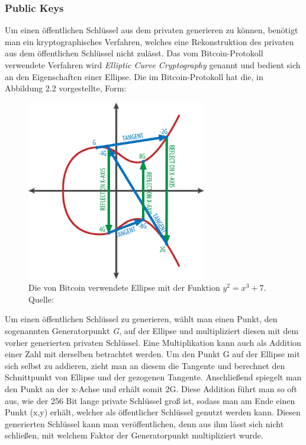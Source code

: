 \subsubsection{Public Keys}
Um einen öffentlichen Schlüssel aus dem privaten generieren zu können, benötigt man ein kryptographisches Verfahren, welches eine Rekonstruktion des privaten aus dem öffentlichen Schlüssel nicht zulässt.
Das vom Bitcoin-Protokoll verwendete Verfahren wird \emph{Elliptic Curve Cryptography} genannt und bedient sich an den Eigenschaften einer Ellipse. Die im Bitcoin-Protokoll hat die, in Abbildung 2.2 vorgestellte, Form:
\begin{figure}[htpb]
	\centering
	\includegraphics[width=0.7\textwidth]{images/elliptic_curve_cryptography.png}
	\caption{Die von Bitcoin verwendete Ellipse mit der Funktion $y^{2} = x^{3} + 7$. \\Quelle: \cite[S. 64]{antanopoulos_2014}}
	\label{6braun:fig:ellipse}
\end{figure}

Um einen öffentlichen Schlüssel zu generieren, wählt man einen Punkt, den sogenannten Generatorpunkt \emph{G}, auf der Ellipse und multipliziert diesen mit dem vorher generierten privaten Schlüssel. Eine Multiplikation kann auch als Addition einer Zahl mit derselben betrachtet werden. Um den Punkt G auf der Ellipse mit sich selbst zu addieren, zieht man an diesem die Tangente und berechnet den Schnittpunkt von Ellipse und der gezogenen Tangente. Anschließend spiegelt man den Punkt an der x-Achse und erhält somit 2G. Diese Addition führt man so oft aus, wie der 256 Bit lange private Schlüssel groß ist, sodass man am Ende einen Punkt (x,y) erhält, welcher als öffentlicher Schlüssel genutzt werden kann. Diesen generierten Schlüssel kann man veröffentlichen, denn aus ihm lässt sich nicht schließen, mit welchem Faktor der Generatorpunkt multipliziert wurde.

